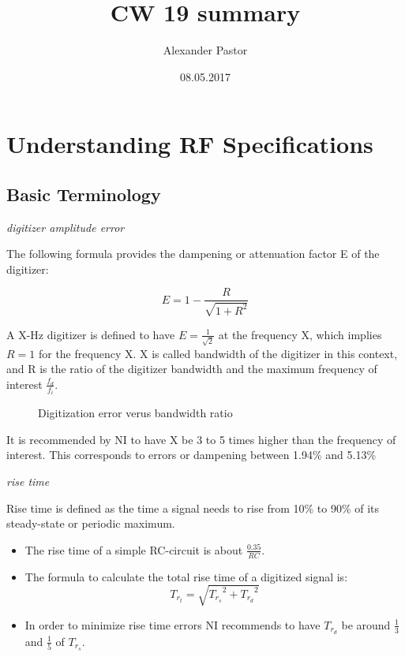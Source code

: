 \documentclass{article}
\begin{document}
\title{CW 19 summary}
\author{Alexander Pastor}
\date{08.05.2017}
\maketitle
\tableofcontents
\newpage

\section{Understanding RF Specifications}

\subsection{Basic Terminology}

\emph{digitizer amplitude error}

The following formula provides the dampening or attenuation factor E of the digitizer:

\begin{equation}
	E = 1- \frac{R}{\sqrt{1+R^2}}
\end{equation}

\medskip

A X-Hz digitizer is defined to have $ E = \frac{1}{\sqrt{2}}$ at the frequency X, which implies $R=1$ for the frequency X. X is called bandwidth of the digitizer in this context, and R is the ratio of the digitizer bandwidth and the maximum frequency of interest $\frac{f_d}{f_i}$.

\begin{figure}[h]
	\centering
	\label{amplitude_error}
	
	\caption{Digitization error verus bandwidth ratio}
\end{figure}

It is recommended by NI to have X be 3 to 5 times higher than the frequency of interest. This corresponds to errors or dampening between 1.94\% and 5.13\% 

\bigskip

\emph{rise time}

Rise time is defined as the time a signal needs to rise from 10\% to 90\% of its steady-state or periodic maximum.

\bigskip

\begin{itemize}
	\item The rise time of a simple RC-circuit is about $\frac{0.35}{RC}$.
	\item The formula to calculate the total rise time of a digitized signal is: $$ T_{r_t} = \sqrt{{T_{r_s}}^2 + {T_{r_d}}^2}$$
	\item In order to minimize rise time errors NI recommends to have $T_{r_d}$ be around $\frac{1}{3}$ and $\frac{1}{5}$ of $T_{r_s}$.
\end{itemize}
\end{document}
